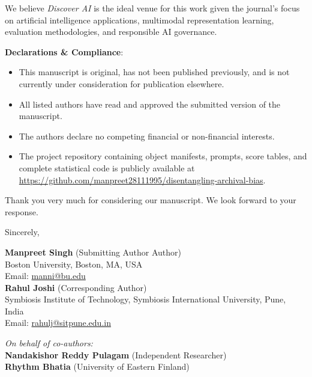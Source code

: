 \documentclass[11pt,a4paper]{article}
\begin{document}
We believe \textit{Discover AI} is the ideal venue for this work given the journal's focus on artificial intelligence applications, multimodal representation learning, evaluation methodologies, and responsible AI governance.

\textbf{Declarations \& Compliance}:
\begin{itemize}
    \item This manuscript is original, has not been published previously, and is not currently under consideration for publication elsewhere.
    \item All listed authors have read and approved the submitted version of the manuscript.
    \item The authors declare no competing financial or non-financial interests.
    \item The project repository containing object manifests, prompts, score tables, and complete statistical code is publicly available at \url{https://github.com/manpreet28111995/disentangling-archival-bias}.
\end{itemize}

Thank you very much for considering our manuscript. We look forward to your response.

\vspace{1.5em}

Sincerely,

\vspace{1em}

\textbf{Manpreet Singh} (Submitting Author Author)\\
Boston University, Boston, MA, USA\\
Email: \href{mailto:manni@bu.edu}{manni@bu.edu}\\

\textbf{Rahul Joshi} (Corresponding Author)\\
Symbiosis Institute of Technology, Symbiosis International University, Pune, India\\
Email: \href{rahulj@sitpune.edu.in}{rahulj@sitpune.edu.in}\\



\vspace{0.5em}

\textit{On behalf of co-authors:}\\
\textbf{Nandakishor Reddy Pulagam} (Independent Researcher)\\
\textbf{Rhythm Bhatia} (University of Eastern Finland)\\
\end{document}
